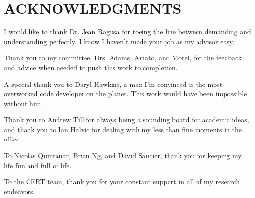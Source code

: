 %
%
%
%


\chapter*{ACKNOWLEDGMENTS}


\indent I would like to thank Dr. Jean Ragusa for toeing the line between demanding and understanding perfectly. I know I haven't made your job as my advisor easy. 

Thank you to my committee, Drs. Adams, Amato, and Morel, for the feedback and advice when needed to push this work to completion.

A special thank you to Daryl Hawkins, a man I'm convinced is the most overworked code developer on the planet. This work would have been impossible without him. 

Thank you to Andrew Till for always being a sounding board for academic ideas, and thank you to Ian Halvic for dealing with my less than fine moments in the office.

To Nicolas Quintanar, Brian Ng, and David Saucier, thank you for keeping my life fun and full of life. 

To the CERT team, thank you for your constant support in all of my research endeavors.




\pagebreak{}